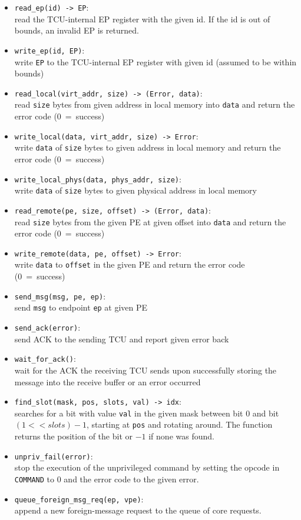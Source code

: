 \begin{itemize}
  \item \texttt{read\_ep(id) -> EP}:\\
  read the TCU-internal EP register with the given id. If the id is out of bounds, an invalid EP is
  returned.
  \item \texttt{write\_ep(id, EP)}:\\
  write \texttt{EP} to the TCU-internal EP register with given id (assumed to be within bounds)
  \item \texttt{read\_local(virt\_addr, size) -> (Error, data)}:\\
  read \texttt{size} bytes from given address in local memory into \texttt{data} and return the error
  code (0~=~success)
  \item \texttt{write\_local(data, virt\_addr, size) -> Error}:\\
  write \texttt{data} of \texttt{size} bytes to given address in local memory and return the error
  code (0~=~success)
  \item \texttt{write\_local\_phys(data, phys\_addr, size)}:\\
  write \texttt{data} of \texttt{size} bytes to given physical address in local memory
  \item \texttt{read\_remote(pe, size, offset) -> (Error, data)}:\\
  read \texttt{size} bytes from the given PE at given offset into \texttt{data} and return the error
  code (0~=~success)
  \item \texttt{write\_remote(data, pe, offset) -> Error}:\\
  write \texttt{data} to \texttt{offset} in the given PE and return the error code (0~=~success)
  \item \texttt{send\_msg(msg, pe, ep)}:\\
  send \texttt{msg} to endpoint \texttt{ep} at given PE
  \item \texttt{send\_ack(error)}:\\
  send ACK to the sending TCU and report given error back
  \item \texttt{wait\_for\_ack()}:\\
  wait for the ACK the receiving TCU sends upon successfully storing the message into the receive
  buffer or an error occurred
  \item \texttt{find\_slot(mask, pos, slots, val) -> idx}:\\
  searches for a bit with value \texttt{val} in the given mask between bit 0 and bit $(1 << slots) -
  1$, starting at \texttt{pos} and rotating around. The function returns the position of the bit or
  $-1$ if none was found.
  \item \texttt{unpriv\_fail(error)}:\\
  stop the execution of the unprivileged command by setting the opcode in \texttt{COMMAND} to 0 and
  the error code to the given error.
  \item \texttt{queue\_foreign\_msg\_req(ep, vpe)}:\cbstart\\
  append a new foreign-message request to the queue of core requests. \cbend
\end{itemize}

